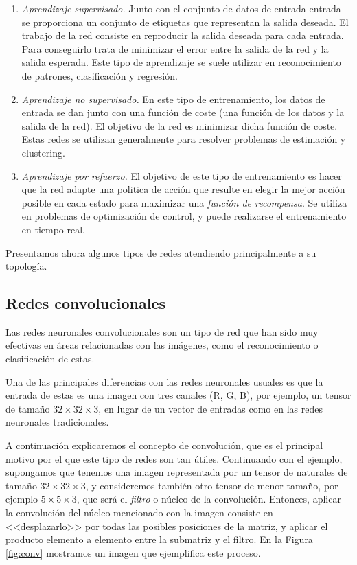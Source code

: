 \documentclass[
  a4paper,
  12pt,
  spanish,
]{scrartcl}
\theoremstyle{teorema-style}
\begin{document}
\begin{enumerate}
\item \textit{Aprendizaje supervisado. } Junto con el conjunto de datos de entrada entrada se proporciona un conjunto de etiquetas que representan la salida deseada. El trabajo de la red consiste en reproducir la salida deseada para cada entrada. Para conseguirlo trata de minimizar el error entre la salida de la red y la salida esperada. Este tipo de aprendizaje se suele utilizar en reconocimiento de patrones, clasificación y regresión.
\item \textit{Aprendizaje no supervisado. } En este tipo de entrenamiento, los
  datos de entrada se dan junto con una función de coste (una función de los
  datos y la salida de la red). El objetivo de la red es minimizar dicha función
  de coste. Estas redes se utilizan generalmente para resolver problemas de
  estimación y clustering.
\item \textit{Aprendizaje por refuerzo. } El objetivo de este tipo de
  entrenamiento es hacer que la red adapte una politica de acción que resulte en elegir la mejor acción posible en cada estado para maximizar una \textit{función de recompensa}. Se utiliza en problemas de optimización de control, y puede realizarse el entrenamiento en tiempo real.
\end{enumerate}

Presentamos ahora algunos tipos de redes atendiendo principalmente a su topología.

\subsection{Redes convolucionales}%
\label{sub:redes_convolucionales}

Las redes neuronales convolucionales son un tipo de red que han sido muy efectivas en áreas relacionadas con las imágenes, como el reconocimiento o clasificación de estas.

Una de las principales diferencias con las redes neuronales usuales es que la entrada de estas es una imagen con tres canales (R, G, B), por ejemplo, un tensor de tamaño $32\times 32 \times 3$, en lugar de un vector de entradas como en las redes neuronales tradicionales.

A continuación explicaremos el concepto de convolución, que es el principal motivo por el que este tipo de redes son tan útiles. Continuando con el ejemplo, supongamos que tenemos una imagen representada por un tensor de naturales de tamaño $32\times 32 \times 3$, y consideremos también otro tensor de menor tamaño, por ejemplo $5 \times 5 \times 3$, que será el \textit{filtro} o núcleo de la convolución. Entonces, aplicar la convolución del núcleo mencionado con la imagen consiste en <<desplazarlo>> por todas las posibles posiciones de la matriz, y aplicar el producto elemento a elemento entre la submatriz y el filtro. En la Figura \ref{fig:conv} mostramos un imagen que ejemplifica este proceso.
\end{document}
